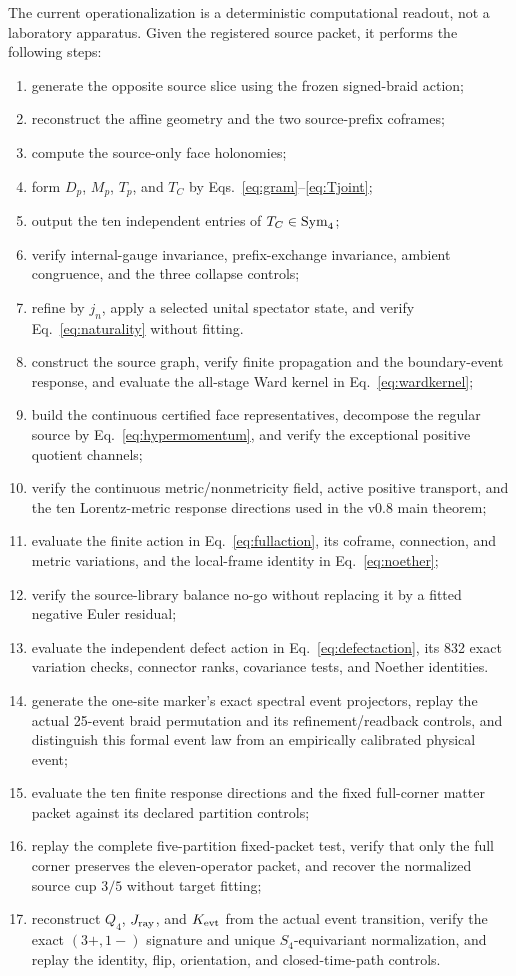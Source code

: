 The current operationalization is a deterministic computational readout, not a laboratory apparatus. Given the registered source packet, it performs the following steps:
\begin{enumerate}
\item generate the opposite source slice using the frozen signed-braid action;
\item reconstruct the affine geometry and the two source-prefix coframes;
\item compute the source-only face holonomies;
\item form $D_p$, $M_p$, $T_p$, and $T_C$ by Eqs.~\eqref{eq:gram}--\eqref{eq:Tjoint};
\item output the ten independent entries of $T_C\in\operatorname{Sym}_4$;
\item verify internal-gauge invariance, prefix-exchange invariance, ambient congruence, and the three collapse controls;
\item refine by $j_n$, apply a selected unital spectator state, and verify Eq.~\eqref{eq:naturality} without fitting.
\item construct the source graph, verify finite propagation and the boundary-event response, and evaluate the all-stage Ward kernel in Eq.~\eqref{eq:wardkernel};
\item build the continuous certified face representatives, decompose the regular source by Eq.~\eqref{eq:hypermomentum}, and verify the exceptional positive quotient channels;
\item verify the continuous metric/nonmetricity field, active positive transport, and the ten Lorentz-metric response directions used in the v0.8 main theorem;
\item evaluate the finite action in Eq.~\eqref{eq:fullaction}, its coframe, connection, and metric variations, and the local-frame identity in Eq.~\eqref{eq:noether};
\item verify the source-library balance no-go without replacing it by a fitted negative Euler residual;
\item evaluate the independent defect action in Eq.~\eqref{eq:defectaction}, its 832 exact variation checks, connector ranks, covariance tests, and Noether identities.
\item generate the one-site marker's exact spectral event projectors, replay the actual 25-event braid permutation and its refinement/readback controls, and distinguish this formal event law from an empirically calibrated physical event;
\item evaluate the ten finite response directions and the fixed full-corner matter packet against its declared partition controls;
\item replay the complete five-partition fixed-packet test, verify that only the full corner preserves the eleven-operator packet, and recover the normalized source cup $3/5$ without target fitting;
\item reconstruct $Q_4$, $J_{\rm ray}$, and $K_{\rm evt}$ from the actual event transition, verify the exact $(3+,1-)$ signature and unique $S_4$-equivariant normalization, and replay the identity, flip, orientation, and closed-time-path controls.
\end{enumerate}

